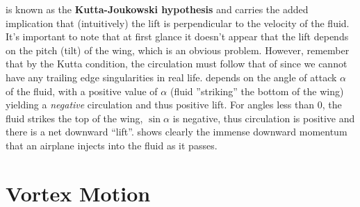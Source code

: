 \documentclass[12pt]{book}
\begin{document}
 is known as the \textbf{Kutta-Joukowski hypothesis} and carries the added implication that (intuitively) the lift is perpendicular to the velocity of the fluid.  It's important to note that at first glance it doesn't appear that the lift depends on the pitch (tilt) of the wing, which is an obvious problem.  However, remember that by the Kutta condition, the circulation must follow that of  since we cannot have any trailing edge singularities in real life.   depends on the angle of attack $\alpha$ of the fluid, with a positive value of $\alpha$ (fluid ''striking'' the bottom of the wing) yielding a \textit{negative} circulation and thus positive lift.  For angles less than 0, the fluid strikes the top of the wing, $\sin\alpha$ is negative, thus circulation is positive and there is a net downward ``lift''.  shows clearly the immense downward momentum that an airplane injects into the fluid as it passes.








\section{Vortex Motion}
\end{document}

